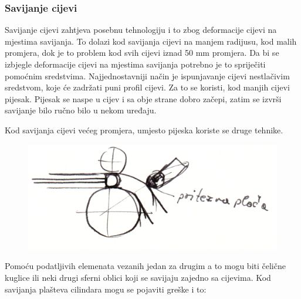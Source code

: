 \documentclass[a4paper,12pt]{article}
\numberwithin{figure}{section}
\begin{document}
\subsubsection{Savijanje cijevi}
Savijanje cijevi zahtjeva posebnu tehnologiju i to zbog deformacije cijevi na mjestima savijanja. To dolazi kod savijanja cijevi na manjem radijusu, kod malih promjera, dok je to problem kod svih cijevi iznad 50 mm promjera. Da bi se izbjegle deformacije cijevi na mjestima savijanja potrebno je to spriječiti pomoćnim sredstvima. Najjednostavniji način je ispunjavanje cijevi nestlačivim sredstvom, koje će zadržati puni profil cijevi. Za to se koristi, kod manjih cijevi pijesak. Pijesak se naspe u cijev i sa obje strane dobro začepi, zatim se izvrši savijanje bilo ručno bilo u nekom uređaju. \par
Kod savijanja cijevi većeg promjera, umjesto pijeska koriste se druge tehnike.
\begin{figure}[!h]
\centering
\includegraphics[scale=0.14]{image_51-2.png}
\end{figure}
\FloatBarrier
Pomoću podatljivih elemenata vezanih jedan za drugim a to mogu biti čelične kuglice ili neki drugi sferni oblici koji se savijaju zajedno sa cijevima. Kod savijanja plašteva cilindara mogu se pojaviti greške i to:
\end{document}
